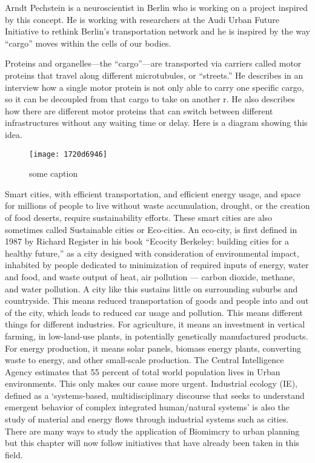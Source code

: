 Arndt Pechstein is a neuroscientist in Berlin who is working on a project inspired by this concept. He is working with researchers at the Audi Urban Future Initiative to rethink Berlin's transportation network and he is inspired by the way ``cargo'' moves within the cells of our bodies.

Proteins and organelles---the ``cargo''---are transported via carriers called motor proteins that travel along different microtubules, or ``streets.'' He describes in an interview how a single motor protein is not only able to carry one specific cargo, so it can be decoupled from that cargo to take on another r. He also describes how there are different motor proteins that can switch between different infrastructures without any waiting time or delay.  Here is a diagram showing this idea.


\begin{figure}
\texttt{[image: 1720d6946]}
\caption{some caption}
\label{fig:1720d6946}
\end{figure}

Smart cities, with efficient transportation, and efficient energy usage, and space for millions of people to live without waste accumulation, drought, or the creation of food deserts, require sustainability efforts. These smart cities are also sometimes called Sustainable cities or Eco-cities. An eco-city, is first defined in 1987 by Richard Register in his book ``Ecocity Berkeley: building cities for a healthy future,''  as a city designed with consideration of environmental impact, inhabited by people dedicated to minimization of required inputs of energy, water and food, and waste output of heat, air pollution --- carbon dioxide, methane, and water pollution.  A city like this sustains little on surrounding suburbs and countryside. This means reduced transportation of goods and people into and out of the city, which leads to reduced car usage and pollution. This means different things for different industries. For agriculture, it means an investment in vertical farming, in low-land-use plants, in potentially genetically manufactured products. For energy production, it means solar panels, biomass energy plants, converting waste to energy, and other small-scale production. The Central Intelligence Agency estimates that 55 percent of total world population lives in Urban environments. This only makes our cause more urgent. Industrial ecology (IE), defined as a `systems-based, multidisciplinary discourse that seeks to understand emergent behavior of complex integrated human/natural systems' is also the study of material and energy flows through industrial systems such as cities. There are many ways to study the application of Biomimcry to urban planning but this chapter will now follow initiatives that have already been taken in this field. 

